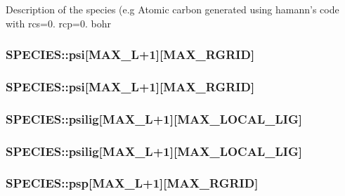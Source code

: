 Description of the species (e.\-g Atomic carbon generated using hamann's code with rcs=0. rcp=0. bohr \hypertarget{struct_s_p_e_c_i_e_s_aeee83a5790fac1a019e1bfec0c867007}{
\subsubsection[{psi}]{ S\-P\-E\-C\-I\-E\-S\-::psi\mbox{[}{\bf M\-A\-X\-\_\-\-L}+1\mbox{]}\mbox{[}{\bf M\-A\-X\-\_\-\-R\-G\-R\-I\-D}\mbox{]}}}\label{struct_s_p_e_c_i_e_s_aeee83a5790fac1a019e1bfec0c867007}
\hypertarget{struct_s_p_e_c_i_e_s_ae928f3332b93d4f91267c9711d01a9bb}{
\subsubsection[{psi}]{ S\-P\-E\-C\-I\-E\-S\-::psi\mbox{[}{\bf M\-A\-X\-\_\-\-L}+1\mbox{]}\mbox{[}{\bf M\-A\-X\-\_\-\-R\-G\-R\-I\-D}\mbox{]}}}\label{struct_s_p_e_c_i_e_s_ae928f3332b93d4f91267c9711d01a9bb}
\hypertarget{struct_s_p_e_c_i_e_s_ae333127abacaf7428cb238baf6833563}{
\subsubsection[{psilig}]{ S\-P\-E\-C\-I\-E\-S\-::psilig\mbox{[}{\bf M\-A\-X\-\_\-\-L}+1\mbox{]}\mbox{[}{\bf M\-A\-X\-\_\-\-L\-O\-C\-A\-L\-\_\-\-L\-I\-G}\mbox{]}}}\label{struct_s_p_e_c_i_e_s_ae333127abacaf7428cb238baf6833563}
\hypertarget{struct_s_p_e_c_i_e_s_aa7f4823f82a2412d2e9e3b0dc9809ecc}{
\subsubsection[{psilig}]{ S\-P\-E\-C\-I\-E\-S\-::psilig\mbox{[}{\bf M\-A\-X\-\_\-\-L}+1\mbox{]}\mbox{[}{\bf M\-A\-X\-\_\-\-L\-O\-C\-A\-L\-\_\-\-L\-I\-G}\mbox{]}}}\label{struct_s_p_e_c_i_e_s_aa7f4823f82a2412d2e9e3b0dc9809ecc}
\hypertarget{struct_s_p_e_c_i_e_s_aadb927ff600e8714b597ae67d8a3eaae}{
\subsubsection[{psp}]{ S\-P\-E\-C\-I\-E\-S\-::psp\mbox{[}{\bf M\-A\-X\-\_\-\-L}+1\mbox{]}\mbox{[}{\bf M\-A\-X\-\_\-\-R\-G\-R\-I\-D}\mbox{]}}}\label{struct_s_p_e_c_i_e_s_aadb927ff600e8714b597ae67d8a3eaae}
